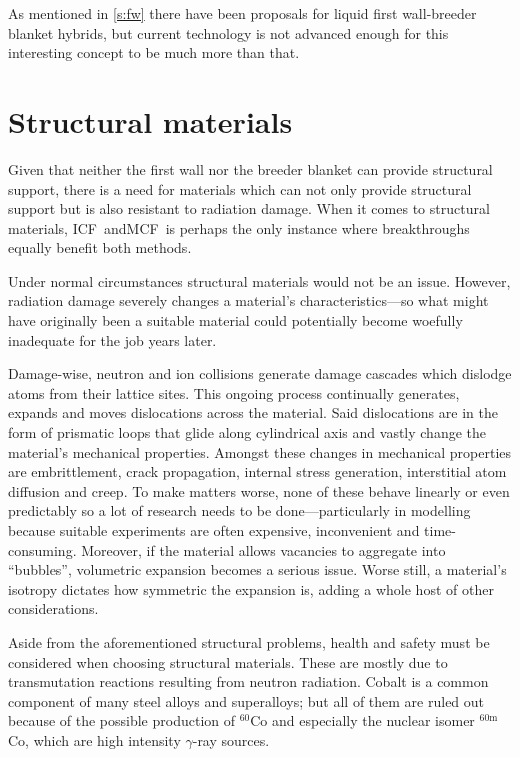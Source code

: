 \documentclass[12pt, a4paper]{article}
\newcommand{\mc}{MCF}
\newcommand{\ic}{ICF}
\begin{document}
		As mentioned in \cref{s:fw} there have been proposals for liquid first wall-breeder blanket hybrids, but current technology is not advanced enough for this interesting concept to be much more than that.
	\section{Structural materials}
		Given that neither the first wall nor the breeder blanket can provide structural support, there is a need for materials which can not only provide structural support but is also resistant to radiation damage. When it comes to structural materials, \ic~and\mc~is perhaps the only instance where breakthroughs equally benefit both methods.
		
		Under normal circumstances structural materials would not be an issue. However, radiation damage severely changes a material's characteristics---so what might have originally been a suitable material could potentially become woefully inadequate for the job years later. 
		
		Damage-wise, neutron and ion collisions generate damage cascades which dislodge atoms from their lattice sites. This ongoing process continually generates, expands and moves dislocations across the material. Said dislocations are in the form of prismatic loops that glide along cylindrical axis and vastly change the material's mechanical properties. Amongst these changes in mechanical properties are embrittlement, crack propagation, internal stress generation, interstitial atom diffusion and creep. To make matters worse, none of these behave linearly or even predictably so a lot of research needs to be done---particularly in modelling because suitable experiments are often expensive, inconvenient and time-consuming. Moreover, if the material allows vacancies to aggregate into ``bubbles'', volumetric expansion becomes a serious issue. Worse still, a material's isotropy dictates how symmetric the expansion is, adding a whole host of other considerations.
		
		Aside from the aforementioned structural problems, health and safety must be considered when choosing structural materials. These are mostly due to transmutation reactions resulting from neutron radiation. Cobalt is a common component of many steel alloys and superalloys; but all of them are ruled out because of the possible production of $^{60}$Co and especially the nuclear isomer $^{60\textrm{m}}$Co, which are high intensity $\gamma$-ray sources.
		
\end{document}
